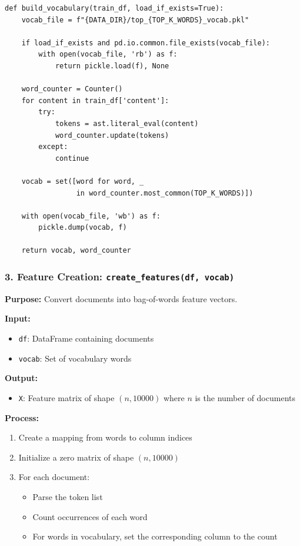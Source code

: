 \documentclass[11pt,a4paper]{article}
\begin{document}
\begin{lstlisting}[style=pythonstyle, caption={Vocabulary Building Function}]
def build_vocabulary(train_df, load_if_exists=True):
    vocab_file = f"{DATA_DIR}/top_{TOP_K_WORDS}_vocab.pkl"
    
    if load_if_exists and pd.io.common.file_exists(vocab_file):
        with open(vocab_file, 'rb') as f:
            return pickle.load(f), None
    
    word_counter = Counter()
    for content in train_df['content']:
        try:
            tokens = ast.literal_eval(content)
            word_counter.update(tokens)
        except:
            continue
    
    vocab = set([word for word, _ 
                 in word_counter.most_common(TOP_K_WORDS)])
    
    with open(vocab_file, 'wb') as f:
        pickle.dump(vocab, f)
    
    return vocab, word_counter
\end{lstlisting}

\subsubsection{3. Feature Creation: \texttt{create\_features(df, vocab)}}

\textbf{Purpose:} Convert documents into bag-of-words feature vectors.

\textbf{Input:}
\begin{itemize}
    \item \texttt{df}: DataFrame containing documents
    \item \texttt{vocab}: Set of vocabulary words
\end{itemize}

\textbf{Output:}
\begin{itemize}
    \item \texttt{X}: Feature matrix of shape $(n, 10000)$ where $n$ is the number of documents
\end{itemize}

\textbf{Process:}
\begin{enumerate}
    \item Create a mapping from words to column indices
    \item Initialize a zero matrix of shape $(n, 10000)$
    \item For each document:
    \begin{itemize}
        \item Parse the token list
        \item Count occurrences of each word
        \item For words in vocabulary, set the corresponding column to the count
    \end{itemize}
\end{enumerate}
\end{document}
